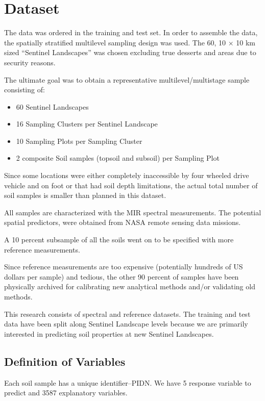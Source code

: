 \documentclass[12pt,letterpaper]{article}
\begin{document}
\section{Dataset}
The data was ordered in the training and test set. In order to assemble the data, the spatially stratified multilevel sampling design was used. The 60, 10 × 10 km sized “Sentinel Landscapes” was chosen excluding true desserts and areas due to security reasons.

The ultimate goal was to obtain a representative multilevel/multistage sample consisting of:
\begin{itemize}
	\item 60 Sentinel Landscapes
	\item 16 Sampling Clusters per Sentinel Landscape
	\item 10 Sampling Plots per Sampling Cluster
	\item 2 composite Soil samples (topsoil and subsoil) per Sampling Plot
\end{itemize}

Since some locations were either completely inaccessible by four wheeled drive vehicle and on foot or that had soil depth limitations, the actual total number of soil samples is smaller than planned in this dataset.

All samples are characterized with the MIR spectral measurements. The potential spatial predictors, were obtained from NASA remote sensing data missions.

A 10 percent subsample of all the soils went on to be specified with more reference measurements.

Since reference measurements are too expensive (potentially hundreds of US dollars per sample) and tedious, the other 90 percent of samples have been physically archived for calibrating new analytical methods and/or validating old methods.

This research consists of spectral and reference datasets. The training and test data have been split along Sentinel Landscape levels because we are primarily interested in predicting soil properties at new Sentinel Landscapes.

\subsection{Definition of Variables}

Each soil sample has a unique identifier--PIDN. We have 5 response variable to predict and 3587 explanatory variables.\\  
\end{document}
